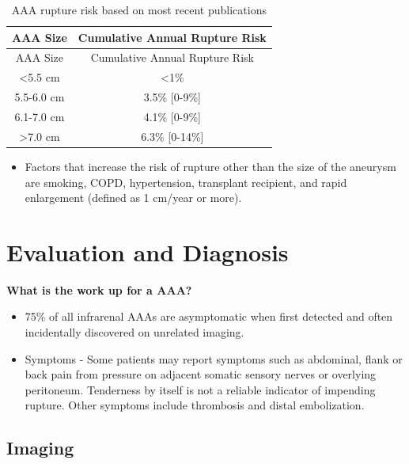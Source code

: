 \documentclass[
]{book}
\providecommand{\tightlist}{%
  \setlength{\itemsep}{0pt}\setlength{\parskip}{0pt}}
\begin{document}
\begin{longtable}[]{@{}cc@{}}
\caption{AAA rupture risk based on most recent publications}\tabularnewline
\toprule()
AAA Size & Cumulative Annual Rupture Risk \\
\midrule()
\endfirsthead
\toprule()
AAA Size & Cumulative Annual Rupture Risk \\
\midrule()
\endhead
\textless5.5 cm & \textless1\%\citep{oliver-williams2019} \\
5.5-6.0 cm & 3.5\% {[}0-9\%{]}\citep{parkinsonRuptureRatesUntreated2015} \\
6.1-7.0 cm & 4.1\% {[}0-9\%{]}\citep{parkinsonRuptureRatesUntreated2015} \\
\textgreater7.0 cm & 6.3\% {[}0-14\%{]}\citep{parkinsonRuptureRatesUntreated2015} \\
\bottomrule()
\end{longtable}

\begin{itemize}
\tightlist
\item
  Factors that increase the risk of rupture other than the size of the
  aneurysm are smoking, COPD, hypertension, transplant recipient, and
  rapid enlargement (defined as 1 cm/year or more).
\end{itemize}

\hypertarget{evaluation-and-diagnosis}{%
\section{Evaluation and Diagnosis}\label{evaluation-and-diagnosis}}

\textbf{What is the work up for a AAA?}
\citep{mooreVascularEndovascularSurgery2019}

\begin{itemize}
\item
  75\% of all infrarenal AAAs are asymptomatic when first detected and
  often incidentally discovered on unrelated imaging.
\item
  Symptoms - Some patients may report symptoms such as abdominal,
  flank or back pain from pressure on adjacent somatic sensory nerves
  or overlying peritoneum. Tenderness by itself is not a reliable
  indicator of impending rupture. Other symptoms include thrombosis
  and distal embolization.
\end{itemize}

\hypertarget{imaging}{%
\subsection{Imaging}\label{imaging}}
\end{document}
